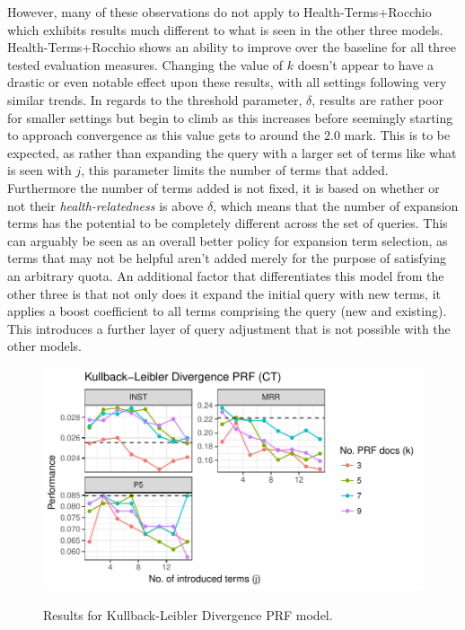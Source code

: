 \documentclass[a4paper]{report}
\begin{document}
However, many of these observations do not apply to Health-Terms+Rocchio which exhibits results much different to what is seen in the other three models. Health-Terms+Rocchio shows an ability to improve over the baseline for all three tested evaluation measures. Changing the value of $k$ doesn't appear to have a drastic or even notable effect upon these results, with all settings following very similar trends. In regards to the threshold parameter, $\delta$, results are rather poor for smaller settings but begin to climb as this increases before seemingly starting to approach convergence as this value gets to around the $2.0$ mark. This is to be expected, as rather than expanding the query with a larger set of terms like what is seen with $j$, this parameter limits the number of terms that added. Furthermore the number of terms added is not fixed, it is based on whether or not their \textit{health-relatedness} is above $\delta$, which means that the number of expansion terms  has the potential to be completely different across the set of queries. This can arguably be seen as an overall better policy for expansion term selection, as terms that may not be helpful aren't added merely for the purpose of satisfying an arbitrary quota. An additional factor that differentiates this model from the other three is that not only does it expand the initial query with new terms, it applies a boost coefficient to all terms comprising the query (new and existing). This introduces a further layer of query adjustment that is not possible with the other models. 

\begin{figure}
\centering
\caption{Results for Kullback-Leibler Divergence PRF model.}
\includegraphics[width=.9\columnwidth]{kldprf.pdf}
\label{htprf_results}
\end{figure}
\end{document}

